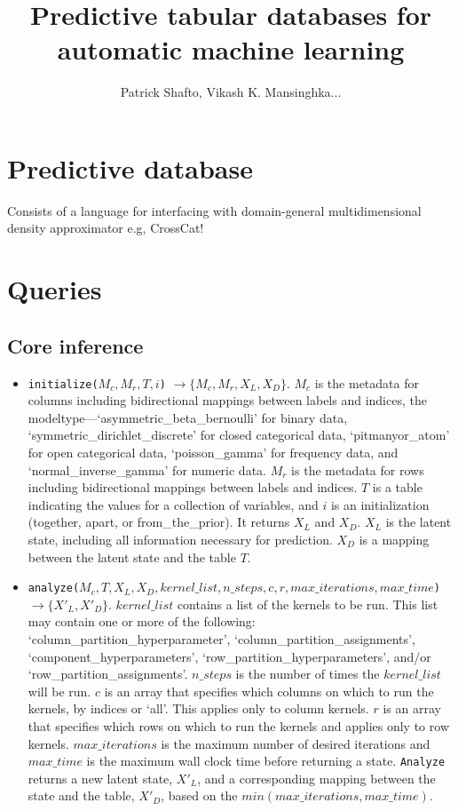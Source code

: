 \documentclass[11pt]{article}
\title{Predictive tabular databases for automatic machine learning}
\author{Patrick Shafto, Vikash K. Mansinghka...}
\begin{document}
\maketitle

\section{Predictive database}

Consists of a language for interfacing with domain-general multidimensional density approximator e.g, CrossCat!

\section{Queries}

\subsection{Core inference}

\begin{itemize}

\item \texttt{initialize($M_c, M_r, T, i$)} $\rightarrow \{ M_c, M_r, X_L, X_D \}$. $M_c$ is the metadata for columns including bidirectional mappings between labels and indices, the modeltype---`asymmetric\_beta\_bernoulli' for binary data, `symmetric\_dirichlet\_discrete' for closed categorical data, `pitmanyor\_atom' for open categorical data, `poisson\_gamma' for frequency data, and `normal\_inverse\_gamma' for numeric data. $M_r$ is the metadata for rows including bidirectional mappings between labels and indices. $T$ is a table indicating the values for a collection of variables, and $i$ is an initialization (together, apart, or from\_the\_prior). It returns $X_L$ and $X_D$. $X_L$ is the latent state, including all information necessary for prediction. $X_D$ is a mapping between the latent state and the table $T$. 

\item \texttt{analyze($M_c, T, X_L, X_D, kernel\_list, n\_steps, c, r, max\_iterations, max\_time$)} $\rightarrow \{X'_L, X'_D\}$. 
$kernel\_list$ contains a list of the kernels to be run. This list may contain one or more of the following: `column\_partition\_hyperparameter', `column\_partition\_assignments', `component\_hyperparameters', `row\_partition\_hyperparameters', and/or `row\_partition\_assignments'.
$n\_steps$ is the number of times the $kernel\_list$ will be run. $c$ is an array that specifies which columns on which to run the kernels, by indices or `all'. This applies only to column kernels. $r$ is an array that specifies which rows on which to run the kernels and applies only to row kernels.
$max\_iterations$ is the maximum number of desired iterations and $max\_time$ is the maximum wall clock time before returning a state. \texttt{Analyze} returns a new latent state, $X'_L$, and a corresponding mapping between the state and the table, $X'_D$, based on the $min(max\_iterations, max\_time)$. 

\end{itemize}
\end{document}
